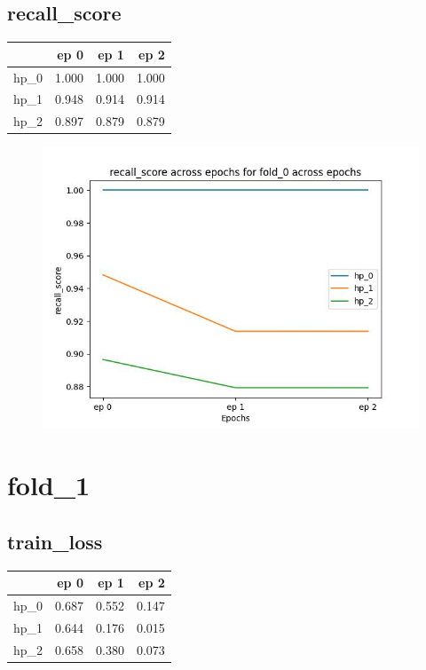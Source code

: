 \documentclass{article}
\begin{document}
\subsection{recall\_score}
\begin{tabular}{lrrr}
\toprule
{} &   ep 0 &   ep 1 &   ep 2 \\
\midrule
hp\_0 &  1.000 &  1.000 &  1.000 \\
hp\_1 &  0.948 &  0.914 &  0.914 \\
hp\_2 &  0.897 &  0.879 &  0.879 \\
\bottomrule
\end{tabular}

\begin{figure}[H]
\includegraphics[scale = 0.75]{fold_0/recall_score}
\end{figure}
\section{fold\_1}
\subsection{train\_loss}
\begin{tabular}{lrrr}
\toprule
{} &   ep 0 &   ep 1 &   ep 2 \\
\midrule
hp\_0 &  0.687 &  0.552 &  0.147 \\
hp\_1 &  0.644 &  0.176 &  0.015 \\
hp\_2 &  0.658 &  0.380 &  0.073 \\
\bottomrule
\end{tabular}
\end{document}
